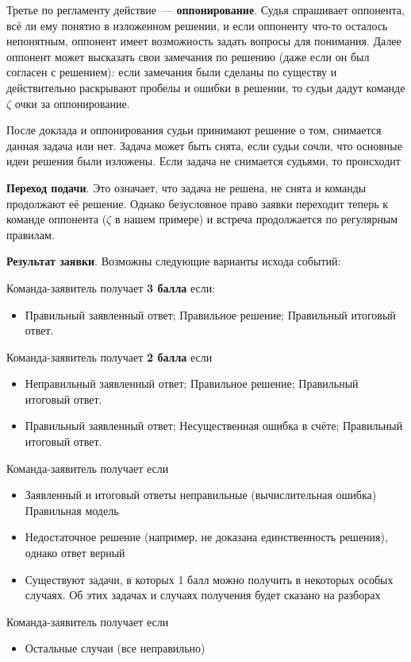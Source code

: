 \documentclass[12pt]{article}
\begin{document}
Третье по регламенту действие~--- \textbf{оппонирование}. Судья спрашивает оппонента, всё ли ему понятно в изложенном решении, и если оппоненту что-то осталось непонятным, оппонент имеет возможность задать вопросы для понимания. Далее оппонент может высказать свои замечания по решению (даже если он был согласен с решением): если замечания были сделаны по существу и действительно раскрывают пробелы и ошибки в решении, то судьи дадут команде $\zeta$ очки за оппонирование.

После доклада и оппонирования судьи принимают решение о том, снимается данная задача или нет. Задача может быть снята, если судьи сочли, что основные идеи решения были изложены. Если задача не снимается судьями, то происходит

\noindent\textbf{Переход подачи}. Это означает, что задача не решена, не снята и команды продолжают её решение. Однако безусловное право заявки переходит теперь к команде оппонента ($\zeta$ в нашем примере) и встреча продолжается по регулярным правилам.

\noindent\textbf{Результат заявки}. Возможны следующие варианты исхода событий:
\begin{list}{)}{\leftmargin=6mm  \topsep=0mm  \itemsep=1pt \parsep=0mm \itemindent=10pt}
\item Команда-заявитель получает \textbf{3 балла} если:
	\begin{itemize}
		\item Правильный заявленный ответ; 
		Правильное решение;
		Правильный итоговый ответ.
	\end{itemize}

\item Команда-заявитель получает \textbf{2 балла} если
	\begin{itemize}
		\item Неправильный заявленный ответ;
	Правильное решение;
	Правильный итоговый ответ.
	\item Правильный заявленный ответ;
	Несущественная ошибка в счёте;
	Правильный итоговый ответ.
	\end{itemize}

\item Команда-заявитель получает  если
	\begin{itemize}
		\item Заявленный и итоговый ответы неправильные (вычислительная ошибка)
	Правильная модель
	\item Недостаточное решение (например, не доказана единственность решения), однако ответ верный
	\item Существуют задачи, в которых 1 балл можно получить в некоторых особых случаях. Об этих задачах и случаях получения будет сказано на разборах
	\end{itemize}

\item Команда-заявитель получает  если
	\begin{itemize}
		\item Остальные случаи (все неправильно) 
	\end{itemize}
\end{list}
\end{document}
